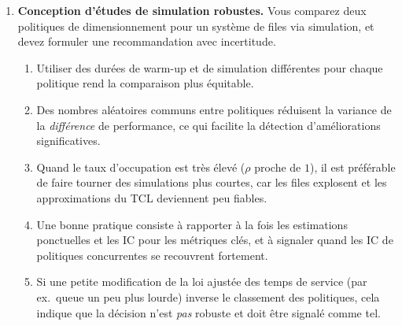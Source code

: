 \documentclass[a4paper,11pt]{article}
\begin{document}
\begin{enumerate}
\item \textbf{Conception d'études de simulation robustes.} Vous comparez deux politiques de dimensionnement pour un système de files via simulation, et devez formuler une recommandation avec incertitude.
  \begin{enumerate}
    \item Utiliser des durées de warm-up et de simulation différentes pour chaque politique rend la comparaison plus équitable.
    \item Des nombres aléatoires communs entre politiques réduisent la variance de la \emph{différence} de performance, ce qui facilite la détection d'améliorations significatives.
    \item Quand le taux d'occupation est très élevé ($\rho$ proche de $1$), il est préférable de faire tourner des simulations plus courtes, car les files explosent et les approximations du TCL deviennent peu fiables.
    \item Une bonne pratique consiste à rapporter à la fois les estimations ponctuelles et les IC pour les métriques clés, et à signaler quand les IC de politiques concurrentes se recouvrent fortement.
    \item Si une petite modification de la loi ajustée des temps de service (par ex.\ queue un peu plus lourde) inverse le classement des politiques, cela indique que la décision n'est \emph{pas} robuste et doit être signalé comme tel.
  \end{enumerate}

\end{enumerate}
\end{document}
